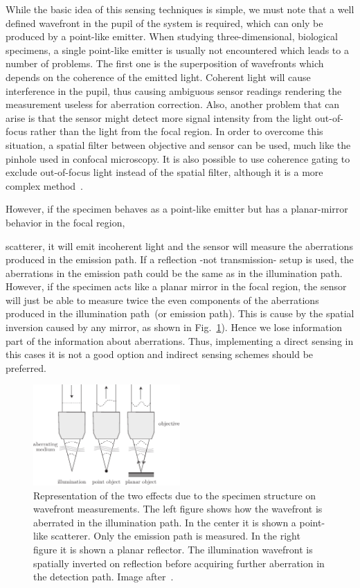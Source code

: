 While the basic idea of this sensing techniques is simple, we must note that a well defined wavefront in the pupil of the system is required, which can only be produced by a point-like emitter. When studying three-dimensional, biological specimens, a single point-like emitter is usually not encountered which leads to a number of problems. The first one is the superposition of wavefronts which depends on the coherence of the emitted light. Coherent light will cause interference in the pupil, thus causing ambiguous sensor readings rendering the measurement useless for aberration correction. Also, another problem that can arise is that the sensor might detect more signal intensity from the light out-of-focus rather than the light from the focal region. In order to overcome this situation, a spatial filter between objective and sensor can be used, much like the pinhole used in confocal microscopy. It is also possible to use coherence gating to exclude out-of-focus light instead of the spatial filter, although it is a more complex method~\cite{scan_TPFM_gated_wavefront}. 

However, if the specimen behaves as a point-like emitter but has a planar-mirror behavior in the focal region, 

scatterer, it will emit incoherent light and the sensor will measure the aberrations produced in the emission path. If a reflection -not transmission- setup is used, the aberrations in the emission path could be the same as in the illumination path. However, if the specimen acts like a planar mirror in the focal region, the sensor will just be able to measure twice the even components of the aberrations produced in the illumination path~(or emission path). This is cause by the spatial inversion caused by any mirror, as shown in Fig.~\ref{fig:abe_direct_sensing}). Hence we lose information part of the information about aberrations. Thus, implementing a direct sensing in this cases it is not a good option and indirect sensing schemes should be preferred.

\begin{figure}[htbp]
	\centering
		\includegraphics[width=0.50\textwidth]{images/abe_direct_sensing}
	\caption{Representation of the two effects due to the specimen structure on wavefront measurements. The left figure shows how the wavefront is aberrated in the illumination path. In the center it is shown a point-like scatterer. Only the emission path is measured. In the right figure it is shown a planar reflector. The illumination wavefront is spatially inverted on reflection before acquiring further aberration in the detection path. Image after~\cite{AOM_basic_ref}.}
	\label{fig:abe_direct_sensing}
\end{figure}

